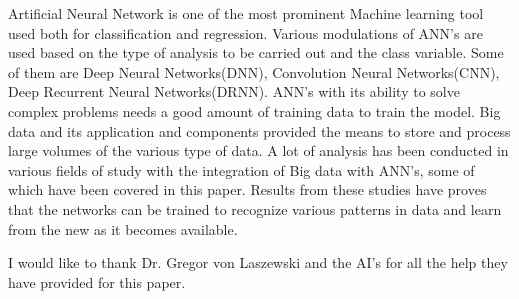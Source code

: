 \documentclass[sigconf]{acmart}
\begin{document}
Artificial Neural Network is one of the most prominent Machine learning tool used both for classification and regression. Various modulations of ANN's are used based on the type of analysis to be carried out and the class variable. Some of them are Deep Neural Networks(DNN), Convolution Neural Networks(CNN), Deep Recurrent Neural Networks(DRNN). ANN's with its ability to solve complex problems needs a good amount of training data to train the model. Big data and its application and components provided the means to store and process large volumes of the various type of data. A lot of analysis has been conducted in various fields of study with the integration of Big data with ANN's, some of which have been covered in this paper. Results from these studies have proves that the networks can be trained to recognize various patterns in data and learn from the new as it becomes available.







\begin{acks}
I would like to thank Dr. Gregor von Laszewski and the AI's for all the help they have provided for this paper.
\end{acks}




 
\end{document}
